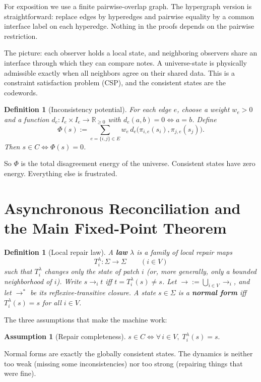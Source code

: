 \documentclass[11pt]{article}
\newtheorem{definition}[theorem]{Definition}
\newtheorem{assumption}[theorem]{Assumption}
\theoremstyle{remark}
\theoremstyle{plain}
\begin{document}
For exposition we use a finite pairwise-overlap graph. The hypergraph version is straightforward: replace edges by hyperedges and pairwise equality by a common interface label on each hyperedge. Nothing in the proofs depends on the pairwise restriction.

The picture: each observer holds a local state, and neighboring observers share an interface through which they can compare notes. A universe-state is physically admissible exactly when all neighbors agree on their shared data. This is a constraint satisfaction problem (CSP), and the consistent states are the codewords.

\begin{definition}[Inconsistency potential]\label{def:potential}
For each edge $e$, choose a weight $w_e>0$ and a function $d_e:I_e\times I_e\to\mathbb{R}_{\ge 0}$ with $d_e(a,b)=0 \iff a=b$. Define
\[
\Phi(s)
:=
\sum_{e=\{i,j\}\in E}
w_e\, d_e\!\bigl(\pi_{i,e}(s_i),\pi_{j,e}(s_j)\bigr).
\]
Then $s\in C \iff \Phi(s)=0$.
\end{definition}

So $\Phi$ is the total disagreement energy of the universe. Consistent states have zero energy. Everything else is frustrated.


\section{Asynchronous Reconciliation and the Main Fixed-Point Theorem}

\begin{definition}[Local repair law]\label{def:repair}
A \textbf{law} $\lambda$ is a family of local repair maps
\[
T_i^\lambda:\Sigma\to\Sigma
\qquad (i\in V)
\]
such that $T_i^\lambda$ changes only the state of patch $i$ (or, more generally, only a bounded neighborhood of $i$). Write $s\to_i t$ iff $t=T_i^\lambda(s)\neq s$. Let $\to := \bigcup_{i\in V}\to_i$, and let $\to^*$ be its reflexive-transitive closure. A state $s\in\Sigma$ is a \textbf{normal form} iff $T_i^\lambda(s)=s$ for all $i\in V$.
\end{definition}

The three assumptions that make the machine work:

\begin{assumption}[Repair completeness]\label{ass:complete}
$s\in C \iff \forall\, i\in V,\; T_i^\lambda(s)=s.$
\end{assumption}

Normal forms are exactly the globally consistent states. The dynamics is neither too weak (missing some inconsistencies) nor too strong (repairing things that were fine).
\end{document}
